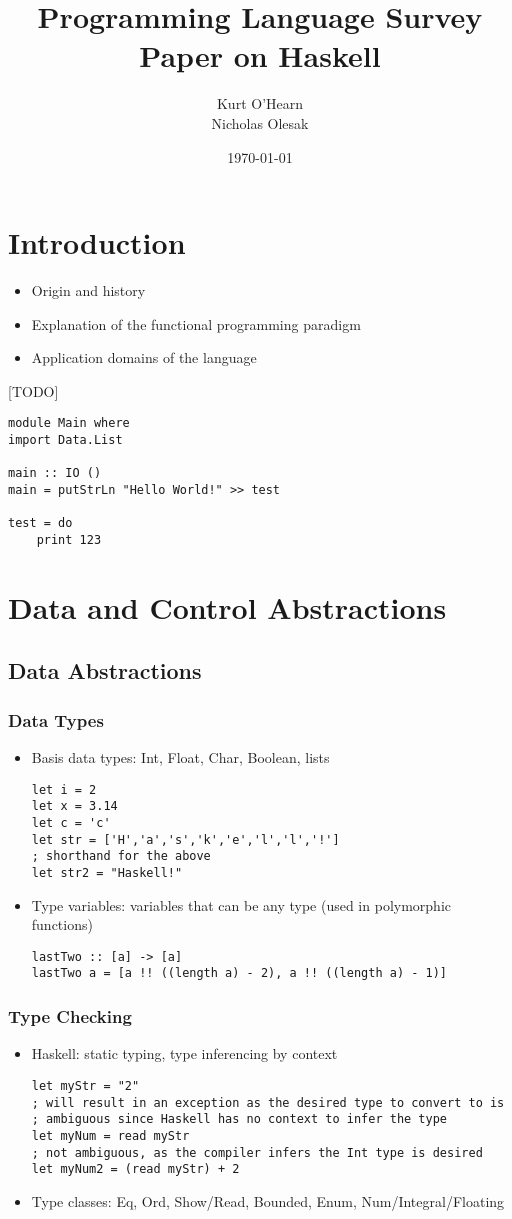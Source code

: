 \documentclass[titlepage,12pt]{article}
\title{Programming Language Survey Paper on Haskell}
\author{
        Kurt O'Hearn\\
        Nicholas Olesak\\
}
\date{\today}
\newcommand{\bi}{\begin{itemize}}
\newcommand{\ei}{\end{itemize}}
\begin{document}
\maketitle 
\setcounter{tocdepth}{3}
\tableofcontents \newpage

\section{Introduction}
\bi
    \item Origin and history
    \item Explanation of the functional programming paradigm
    \item Application domains of the language
\ei
[TODO]~\cite{learnyouahaskell}
\begin{verbatim}
module Main where
import Data.List

main :: IO ()
main = putStrLn "Hello World!" >> test

test = do 
    print 123
\end{verbatim}

\section{Data and Control Abstractions}


\subsection{Data Abstractions}
\subsubsection{Data Types}
\bi
    \item Basis data types: Int, Float, Char, Boolean, lists
\begin{verbatim}
let i = 2
let x = 3.14
let c = 'c'
let str = ['H','a','s','k','e','l','l','!']
; shorthand for the above
let str2 = "Haskell!"
\end{verbatim}

    \item Type variables: variables that can be any type (used in polymorphic functions)
\begin{verbatim}
lastTwo :: [a] -> [a]
lastTwo a = [a !! ((length a) - 2), a !! ((length a) - 1)]
\end{verbatim}
\ei

\subsubsection{Type Checking}
\bi
    \item Haskell: static typing, type inferencing by context
\begin{verbatim}
let myStr = "2"
; will result in an exception as the desired type to convert to is
; ambiguous since Haskell has no context to infer the type
let myNum = read myStr
; not ambiguous, as the compiler infers the Int type is desired
let myNum2 = (read myStr) + 2
\end{verbatim}
    \item Type classes: Eq, Ord, Show/Read, Bounded, Enum, Num/Integral/Floating
\ei
\end{document}
